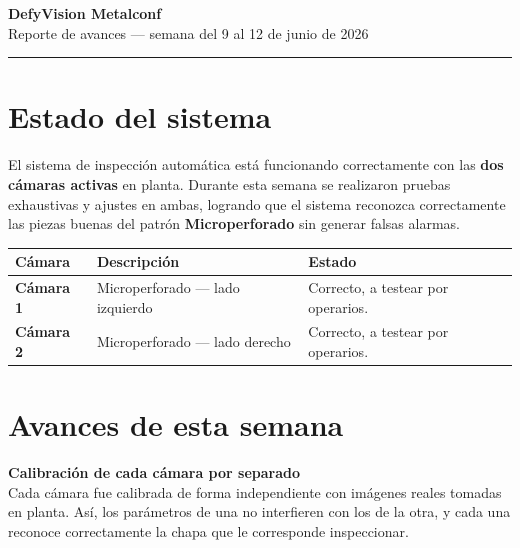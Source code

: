 \documentclass[11pt, a4paper]{article}
\begin{document}
\thispagestyle{fancy}

\begin{center}
  {\fontsize{20}{24}\selectfont\bfseries\color{navy} DefyVision Metalconf}\\[6pt]
  {\large\color{textsub} Reporte de avances — semana del 9 al 12 de junio de 2026}\\[4pt]
\end{center}

{\color{navy}\rule{\textwidth}{1.5pt}}

\vspace{4pt}

\section{Estado del sistema}

El sistema de inspección automática está funcionando correctamente con las
\textbf{dos cámaras activas} en planta. Durante esta semana se realizaron pruebas
exhaustivas y ajustes en ambas, logrando que el sistema reconozca correctamente
las piezas buenas del patrón \textbf{Microperforado} sin generar falsas alarmas.

\vspace{8pt}

\begin{tabularx}{\textwidth}{>{\bfseries}p{3.5cm} X C{5cm}}
  \color{white}\bfseries Cámara &
  \color{white}\bfseries Descripción &
  \color{white}\bfseries Estado \\
  \hline
  Cámara 1 & Microperforado — lado izquierdo & Correcto, a testear por operarios. \\
  Cámara 2 & Microperforado — lado derecho   & Correcto, a testear por operarios. \\
  \hline
\end{tabularx}

\section{Avances de esta semana}

\begin{abox}
\textbf{Calibración de cada cámara por separado}\\[4pt]
Cada cámara fue calibrada de forma independiente con imágenes reales tomadas en
planta. Así, los parámetros de una no interfieren con los de la otra, y cada una
reconoce correctamente la chapa que le corresponde inspeccionar.
\end{abox}
\end{document}
